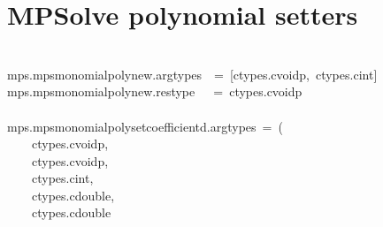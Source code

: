 \documentclass{article}\usepackage[]{graphicx}\usepackage[dvipsnames,table]{xcolor}
\makeatletter
\newcommand{\hlopt}[1]{\textcolor[rgb]{0,0,0}{#1}}%
\newcommand{\hldef}[1]{\textcolor[rgb]{0.345,0.345,0.345}{#1}}%
\newenvironment{kframe}{%
 \def\at@end@of@kframe{}%
 \ifinner\ifhmode%
  \def\at@end@of@kframe{\end{minipage}}%
  \begin{minipage}{\columnwidth}%
 \fi\fi%
 \def\FrameCommand##1{\hskip\@totalleftmargin \hskip-\fboxsep
 \colorbox{shadecolor}{##1}\hskip-\fboxsep
     \hskip-\linewidth \hskip-\@totalleftmargin \hskip\columnwidth}%
 \MakeFramed {\advance\hsize-\width
   \@totalleftmargin\z@ \linewidth\hsize
   \@setminipage}}%
 {\par\unskip\endMakeFramed%
 \at@end@of@kframe}
\newenvironment{knitrout}{}{} %
\makeatother
\begin{document}
\section{MPSolve polynomial setters}
\begin{center}
\begin{minipage}[m]{15cm}
\begin{knitrout}\small
{}\color{fgcolor}\begin{kframe}
\noindent
\ttfamily
\hldef{}\hspace*{\fill}\\
\hldef{\textunderscore mps}\hlopt{.}\hldef{mps\textunderscore monomial\textunderscore poly\textunderscore new}\hlopt{.}\hldef{argtypes}\hldef{\ \ }\hldef{}\hlopt{=\ {[}}\hldef{ctypes}\hlopt{.}\hldef{c\textunderscore void\textunderscore p}\hlopt{,\ }\hldef{ctypes}\hlopt{.}\hldef{c\textunderscore int}\hlopt{{]}\ }\hldef{}\hspace*{\fill}\\
\hldef{\textunderscore mps}\hlopt{.}\hldef{mps\textunderscore monomial\textunderscore poly\textunderscore new}\hlopt{.}\hldef{restype}\hldef{\ \ \ }\hldef{}\hlopt{=\ }\hldef{ctypes}\hlopt{.}\hldef{c\textunderscore void\textunderscore p\ }\hspace*{\fill}\\
\hldef{}\hspace*{\fill}\\
\hldef{\textunderscore mps}\hlopt{.}\hldef{mps\textunderscore monomial\textunderscore poly\textunderscore set\textunderscore coefficient\textunderscore d}\hlopt{.}\hldef{argtypes\ }\hlopt{=\ (}\hspace*{\fill}\\
\hldef{}\hldef{\ \ \ \ }\hldef{ctypes}\hlopt{.}\hldef{c\textunderscore void\textunderscore p}\hlopt{,\ }\hspace*{\fill}\\
\hldef{}\hldef{\ \ \ \ }\hldef{ctypes}\hlopt{.}\hldef{c\textunderscore void\textunderscore p}\hlopt{,\ }\hspace*{\fill}\\
\hldef{}\hldef{\ \ \ \ }\hldef{ctypes}\hlopt{.}\hldef{c\textunderscore int}\hlopt{,}\hspace*{\fill}\\
\hldef{}\hldef{\ \ \ \ }\hldef{ctypes}\hlopt{.}\hldef{c\textunderscore double}\hlopt{,\ }\hspace*{\fill}\\
\hldef{}\hldef{\ \ \ \ }\hldef{ctypes}\hlopt{.}\hldef{c\textunderscore double}\hspace*{\fill}\\

\end{kframe}
\end{knitrout}
\end{minipage}
\end{center}
\end{document}
